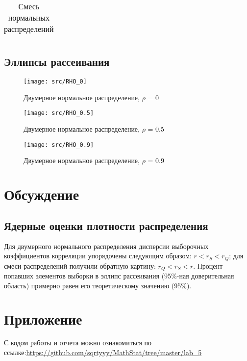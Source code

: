 \documentclass[a4paper]{article}
\begin{document}
            \begin{table}[H]
                \centering
                \begin{tabular}{| c | c | c | c |}
                    \hline
                    
                \end{tabular}{}
                \caption{Смесь нормальных распределений}
                \label{tab:mix_normal}
            \end{table}

        \subsection{Эллипсы рассеивания}
             \begin{figure}[H]
                 \centering
                 \texttt{[image: src/RHO\_0]}
                 \caption{Двумерное нормальное распределение, $\rho$ = 0}
                 \label{fig:rho_0}
             \end{figure}

             \begin{figure}[H]
                 \centering
                 \texttt{[image: src/RHO\_0.5]}
                 \caption{Двумерное нормальное распределение, $\rho$ = 0.5}
                 \label{fig:rho_0_5}
             \end{figure}

             \begin{figure}[H]
                 \centering
                 \texttt{[image: src/RHO\_0.9]}
                 \caption{Двумерное нормальное распределение, $\rho$ = 0.9}
                 \label{fig:rho_0_9}
             \end{figure}

    \section{Обсуждение}
        \subsection{Ядерные оценки плотности распределения}
            \noindent Для двумерного нормального распределения дисперсии выборочных коэффициентов корреляции упорядочены следующим образом: $r < r_{S} < r_{Q}$; для смеси распределений получили обратную картину: $r_{Q} < r_{S} < r$.
            \newline
            \noindent Процент попавших элементов выборки в эллипс рассеивания (95$\%$-ная доверительная область) примерно равен его теоретическому значению (95$\%$).

    \section{Приложение}
        С кодом работы и отчета можно ознакомиться по ссылке:\;\url{https://github.com/sqrtyyy/MathStat/tree/master/lab_5}
\end{document}
